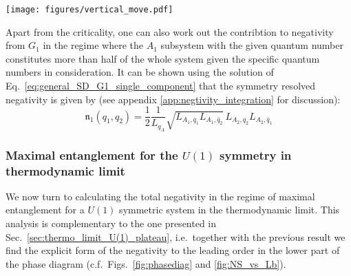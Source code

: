 \documentclass[aps,pra,reprint,superscriptaddress,twocolumn,notitlepage]{revtex4-1}
\numberwithin{equation}{section}
\begin{document}
\begin{figure*}
    \centering
    \texttt{[image: figures/vertical\_move.pdf]}
    \caption{Evolution of the negativity spectrum as the size of subsystem $B$ is increased for $U(1)$ symmetric systems. This trend corresponds to sweeping a vertical path from bottom to top in the phase diagram as shown in the first panel. The colored circles in each panel are numerical simulations (averaged over $10^4$ samples) and solid lines correspond to the numerical solutions to Eqs.~(\ref{eq:general_SD_G1_single_component}) and ~(\ref{eq:general_SD_G2}) from random matrix theory. Here, we set $N_{A_2}=3$ and $N_{A_1}=6$ and the filling fractions are $\nu_A = \frac{1}{3}$ and $\nu_B = \frac{1}{2}$.
    Note that the points within the critical region (shaded area) of the phase diagram are characterized by a diverging spectral density at the origin (panels (a)-(c)).}
    \label{fig:NS_vs_Lb}
\end{figure*}






Apart from the criticality, one can also work out the contribtion to negativity from $G_1$ in the regime where the $A_1$ subsystem with the given quantum number constitutes more than half of the whole system given the specific quantum numbers in consideration. It can be shown using the solution of Eq.~\eqref{eq:general_SD_G1_single_component} that the symmetry resolved negativity is given by (see appendix \ref{app:negtivity_integration} for discussion):
\begin{equation}\label{eq:neg_sym_resolved_max_entanglement_G1}
    \mathfrak{n}_{1}(q_1,q_2)
    =
    \frac12 \frac{1}{L_{q_A}} \sqrt{L_{A_1,q_1} L_{A_1,\bar{q}_2}} \, L_{A_2,q_2} L_{A_2, \bar{q}_1}
\end{equation}




\subsubsection{Maximal entanglement for the $U(1)$ symmetry in thermodynamic limit}
We now turn to calculating the total negativity in the regime of maximal entanglement for a $U(1)$ symmetric system in the thermodynamic limit. This analysis is complementary to the one presented in Sec.~\ref{sec:thermo_limit_U(1)_plateau}, i.e.~together with the previous result we find the explicit form of the negativity to the leading order in the lower part of the phase diagram (c.f.~Figs.~\ref{fig:phasediag} and \ref{fig:NS_vs_Lb}).
\end{document}

